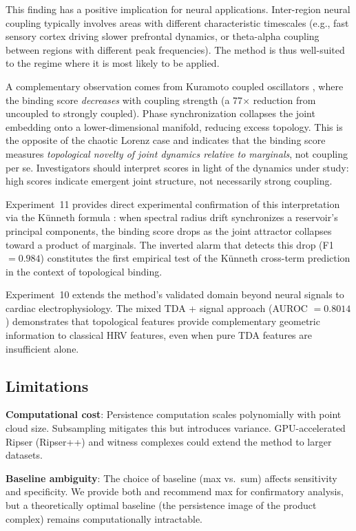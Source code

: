 \documentclass[11pt,a4paper]{article}
\begin{document}
This finding has a positive implication for neural applications.
Inter-region neural coupling typically involves areas with different characteristic timescales (e.g., fast sensory cortex driving slower prefrontal dynamics, or theta-alpha coupling between regions with different peak frequencies).
The method is thus well-suited to the regime where it is most likely to be applied.

A complementary observation comes from Kuramoto coupled oscillators \citep{kuramoto1984chemical}, where the binding score \emph{decreases} with coupling strength (a 77$\times$ reduction from uncoupled to strongly coupled).
Phase synchronization collapses the joint embedding onto a lower-dimensional manifold, reducing excess topology.
This is the opposite of the chaotic Lorenz case and indicates that the binding score measures \emph{topological novelty of joint dynamics relative to marginals}, not coupling per se.
Investigators should interpret scores in light of the dynamics under study: high scores indicate emergent joint structure, not necessarily strong coupling.

Experiment~11 provides direct experimental confirmation of this interpretation via the K\"unneth formula \citep{hatcher2002algebraic}: when spectral radius drift synchronizes a reservoir's principal components, the binding score drops as the joint attractor collapses toward a product of marginals.
The inverted alarm that detects this drop (F1 $= 0.984$) constitutes the first empirical test of the K\"unneth cross-term prediction in the context of topological binding.

Experiment~10 extends the method's validated domain beyond neural signals to cardiac electrophysiology.
The mixed TDA + signal approach (AUROC $= 0.8014$) demonstrates that topological features provide complementary geometric information to classical HRV features, even when pure TDA features are insufficient alone.

\subsection{Limitations}

\textbf{Computational cost}: Persistence computation scales polynomially with point cloud size.
Subsampling mitigates this but introduces variance.
GPU-accelerated Ripser (Ripser++) and witness complexes could extend the method to larger datasets.

\textbf{Baseline ambiguity}: The choice of baseline (max vs.\ sum) affects sensitivity and specificity.
We provide both and recommend max for confirmatory analysis, but a theoretically optimal baseline (the persistence image of the product complex) remains computationally intractable.
\end{document}
